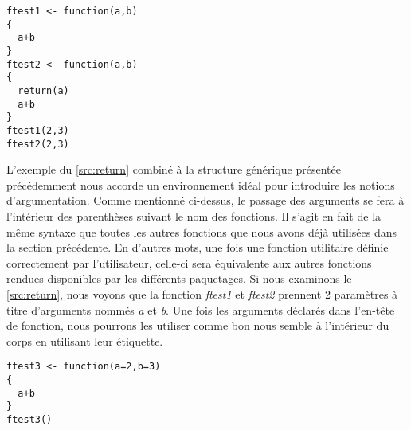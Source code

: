 \begin{lstlisting}[caption = L'instruction \emph{return} et le retour standard d'une fonction R ,label=src:return]
ftest1 <- function(a,b)
{
  a+b
}
ftest2 <- function(a,b)
{
  return(a)
  a+b
}
ftest1(2,3)
ftest2(2,3)
\end{lstlisting}

\vspace{\baselineskip}
\noindent
L'exemple du \autoref{src:return} combiné à la structure générique présentée précédemment nous accorde un environnement idéal pour introduire les notions d'argumentation. Comme mentionné ci-dessus, le passage des arguments se fera à l'intérieur des parenthèses suivant le nom des fonctions. Il s'agit en fait de la même syntaxe que toutes les autres fonctions que nous avons déjà utilisées dans la section précédente. En d'autres mots, une fois une fonction utilitaire définie correctement par l'utilisateur, celle-ci sera équivalente aux autres fonctions rendues disponibles par les différents paquetages. Si nous examinons le \autoref{src:return}, nous voyons que la fonction \emph{ftest1} et \emph{ftest2} prennent 2 paramètres à titre d'arguments nommés \emph{a} et \emph{b}. Une fois les arguments déclarés dans l'en-tête de fonction, nous pourrons les utiliser comme bon nous semble à l'intérieur du corps en utilisant leur étiquette.

\begin{lstlisting}[caption = Définir des valeurs par défauts dans les fonctions utilitaires,label=src:defaultParams]
ftest3 <- function(a=2,b=3)
{
  a+b
}
ftest3()
\end{lstlisting}

